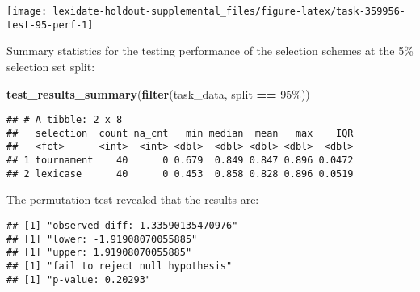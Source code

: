 \documentclass[
]{book}
\newenvironment{Shaded}{\begin{snugshade}}{\end{snugshade}}
\newcommand{\AttributeTok}[1]{\textcolor[rgb]{0.13,0.29,0.53}{#1}}
\newcommand{\DecValTok}[1]{\textcolor[rgb]{0.00,0.00,0.81}{#1}}
\newcommand{\FunctionTok}[1]{\textcolor[rgb]{0.13,0.29,0.53}{\textbf{#1}}}
\newcommand{\NormalTok}[1]{#1}
\newcommand{\OtherTok}[1]{\textcolor[rgb]{0.56,0.35,0.01}{#1}}
\newcommand{\SpecialCharTok}[1]{\textcolor[rgb]{0.81,0.36,0.00}{\textbf{#1}}}
\newcommand{\StringTok}[1]{\textcolor[rgb]{0.31,0.60,0.02}{#1}}
\begin{document}
\texttt{[image: lexidate-holdout-supplemental\_files/figure-latex/task-359956-test-95-perf-1]}

Summary statistics for the testing performance of the selection schemes at the 5\% selection set split:

\begin{Shaded}
\begin{Highlighting}[]
\FunctionTok{test\_results\_summary}\NormalTok{(}\FunctionTok{filter}\NormalTok{(task\_data, split }\SpecialCharTok{==} \StringTok{\textquotesingle{}95\%\textquotesingle{}}\NormalTok{))}
\end{Highlighting}
\end{Shaded}

\begin{verbatim}
## # A tibble: 2 x 8
##   selection  count na_cnt   min median  mean   max    IQR
##   <fct>      <int>  <int> <dbl>  <dbl> <dbl> <dbl>  <dbl>
## 1 tournament    40      0 0.679  0.849 0.847 0.896 0.0472
## 2 lexicase      40      0 0.453  0.858 0.828 0.896 0.0519
\end{verbatim}

The permutation test revealed that the results are:

\begin{Shaded}
\end{Shaded}

\begin{verbatim}
## [1] "observed_diff: 1.33590135470976"
## [1] "lower: -1.91908070055885"
## [1] "upper: 1.91908070055885"
## [1] "fail to reject null hypothesis"
## [1] "p-value: 0.20293"
\end{verbatim}
\end{document}
